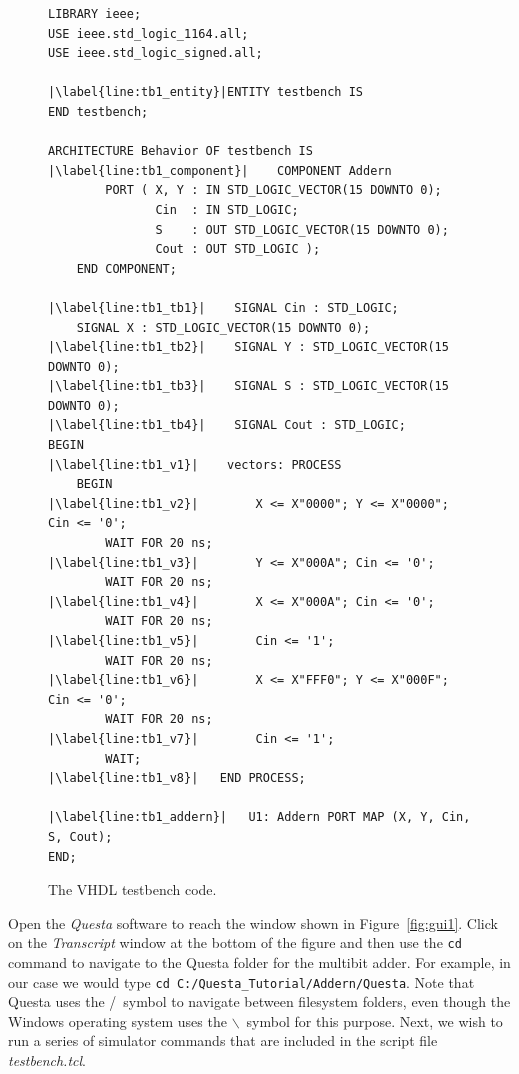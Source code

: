 \documentclass[11pt, twoside, pdftex]{article}
\begin{document}
\lstset{language=VHDL,numbers=left,escapechar=|}
\begin{figure}[h!]
\begin{center}
\begin{minipage}[t]{15 cm}
\begin{lstlisting}[name=testbench]
LIBRARY ieee;                                               
USE ieee.std_logic_1164.all;                                
USE ieee.std_logic_signed.all;

|\label{line:tb1_entity}|ENTITY testbench IS
END testbench;

ARCHITECTURE Behavior OF testbench IS
|\label{line:tb1_component}|    COMPONENT Addern
        PORT ( X, Y : IN STD_LOGIC_VECTOR(15 DOWNTO 0);
               Cin  : IN STD_LOGIC;
               S    : OUT STD_LOGIC_VECTOR(15 DOWNTO 0);
               Cout : OUT STD_LOGIC );
    END COMPONENT;

|\label{line:tb1_tb1}|    SIGNAL Cin : STD_LOGIC;
    SIGNAL X : STD_LOGIC_VECTOR(15 DOWNTO 0);
|\label{line:tb1_tb2}|    SIGNAL Y : STD_LOGIC_VECTOR(15 DOWNTO 0);
|\label{line:tb1_tb3}|    SIGNAL S : STD_LOGIC_VECTOR(15 DOWNTO 0);
|\label{line:tb1_tb4}|    SIGNAL Cout : STD_LOGIC;
BEGIN
|\label{line:tb1_v1}|    vectors: PROCESS           
    BEGIN
|\label{line:tb1_v2}|        X <= X"0000"; Y <= X"0000"; Cin <= '0';
        WAIT FOR 20 ns;
|\label{line:tb1_v3}|        Y <= X"000A"; Cin <= '0';
        WAIT FOR 20 ns;
|\label{line:tb1_v4}|        X <= X"000A"; Cin <= '0';
        WAIT FOR 20 ns;
|\label{line:tb1_v5}|        Cin <= '1';
        WAIT FOR 20 ns;
|\label{line:tb1_v6}|        X <= X"FFF0"; Y <= X"000F"; Cin <= '0';
        WAIT FOR 20 ns;
|\label{line:tb1_v7}|        Cin <= '1';
        WAIT;
|\label{line:tb1_v8}|   END PROCESS;                                          

|\label{line:tb1_addern}|   U1: Addern PORT MAP (X, Y, Cin, S, Cout);
END;
\end{lstlisting}
\end{minipage}
\caption{The VHDL testbench code.}
\label{fig:tb1}
\end{center}
\end{figure}

\noindent
Open the {\it Questa} software to reach the window shown in Figure~\ref{fig:gui1}.
Click on the {\it Transcript} window at the bottom of the figure and then use the
\texttt{cd} command to navigate to the Questa folder for the multibit adder. For 
example, in our case we would type \texttt{cd C:/Questa\_Tutorial/Addern/Questa}. 
Note that Questa uses the /~symbol to navigate between filesystem folders, even though 
the Windows operating system uses the $\backslash$~symbol for this purpose.
Next, we wish to run a series of simulator commands that are included in the script file
{\it testbench.tcl}. 
\end{document}
